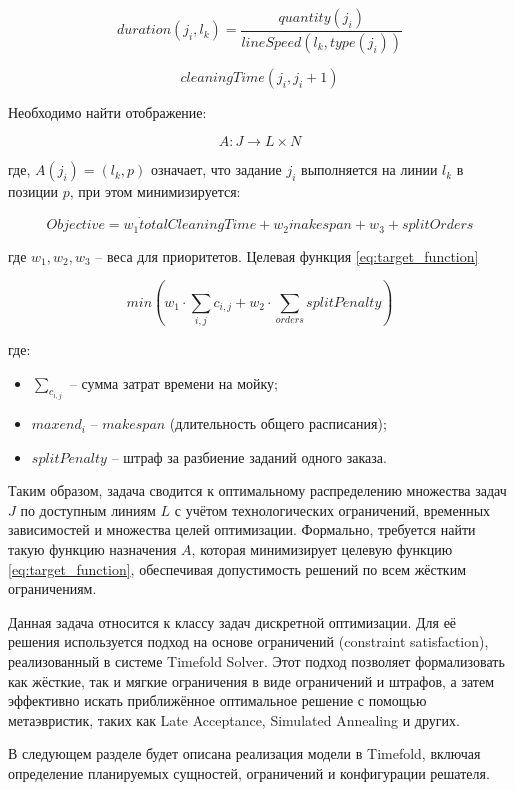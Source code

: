 \begin{equation}
    duration(j_i, l_k) = \frac{quantity(j_i)}{lineSpeed(l_k,type(j_i))}
\end{equation}

\begin{equation}
    cleaningTime(j_i, j_i + 1)
    \label{eq:cleaning_time}
\end{equation}

\noindent Необходимо найти отображение:

\begin{equation}
    A : J \rightarrow L \times N
    \label{eq:find}
\end{equation}

\noindent где, $A(j_i) = (l_k,p)$ означает, что задание $j_i$ выполняется на линии $l_k$  в позиции $p$, при этом минимизируется:

\begin{equation}
    Objective = w_1 \dot totalCleaningTime + w_2 \dot makespan + w_3 + splitOrders
\end{equation}

\noindent где $w_1, w_2, w_3$ -- веса для приоритетов. Целевая функция \eqref{eq:target_function}

\begin{equation}
    min \left(w_1 \cdot \sum_{i,j}c_{i,j} + w_2 \cdot \sum_{orders} splitPenalty \right)
    \label{eq:target_function}
\end{equation}

\noindent где:

\begin{itemize}
    \item $\sum_{c_{i,j}}$ -- сумма затрат времени на мойку;
    \item $max end_i$ -- $makespan$ (длительность общего расписания);
    \item $splitPenalty$ -- штраф за разбиение заданий одного заказа.
\end{itemize}

Таким образом, задача сводится к оптимальному распределению множества задач $J$ по доступным линиям $L$ с учётом технологических ограничений, временных зависимостей и множества целей оптимизации. Формально, требуется найти такую функцию назначения $A$, которая минимизирует целевую функцию \eqref{eq:target_function}, обеспечивая допустимость решений по всем жёстким ограничениям.

Данная задача относится к классу задач дискретной оптимизации. Для её решения используется подход на основе ограничений (constraint satisfaction), реализованный в системе Timefold Solver. Этот подход позволяет формализовать как жёсткие, так и мягкие ограничения в виде ограничений и штрафов, а затем эффективно искать приближённое оптимальное решение с помощью метаэвристик, таких как Late Acceptance, Simulated Annealing и других.

В следующем разделе будет описана реализация модели в Timefold, включая определение планируемых сущностей, ограничений и конфигурации решателя.

